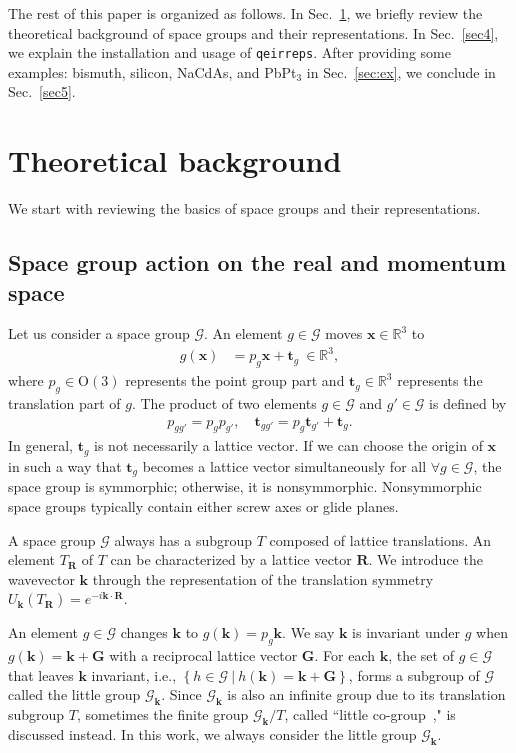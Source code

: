 \documentclass[3p,preprint]{elsarticle}
\newcommand{\bx}{\bm{x}}
\newcommand{\bk}{\bm{k}}
\newcommand{\bt}{\bm{t}}
\newcommand{\bR}{\bm{R}}
\newcommand{\bG}{\bm{G}}
\newcommand{\calG}{\mathcal{G}}
\newcommand{\calGk}{\mathcal{G}_{\bm{k}}}
\begin{document}
The rest of this paper is organized as follows. 
In Sec.~\ref{sec2}, we briefly review the theoretical background of space groups and their representations. 
In Sec.~\ref{sec4}, we explain the installation and usage of \texttt{qeirreps}. 
After providing some examples: bismuth, silicon, NaCdAs, and PbPt$_3$ in Sec.~\ref{sec:ex}, we conclude in Sec.~\ref{sec5}.

\section{Theoretical background}
\label{sec2}
We start with reviewing the basics of space groups and their representations.  

\subsection{Space group action on the real and momentum space}
\label{subsec:SG}
Let us consider a space group $\calG$. An element $g \in \calG$ moves $\bx\in\mathbb{R}^3$ to
\begin{align}
\label{eq:SG}
g(\bx) &= p_g \bx + \bt_{g}\ \in \mathbb{R}^3,
\end{align}
where $p_g\in\text{O}(3)$ represents the point group part and $\bt_{g}\in\mathbb{R}^3$ represents the translation part of $g$. The product of two elements $g\in \calG$ and $g'\in \calG$ is defined by
\begin{align}
\label{product_G}
p_{gg'} = p_gp_{g'}, \quad \bt_{gg'} = p_g\bt_{g'} + \bt_{g}.
\end{align}
In general, $\bt_{g}$ is not necessarily a lattice vector. If we can choose the origin of $\bx$ in such a way that $\bt_{g}$ becomes a lattice vector simultaneously for all $\forall g \in \calG$,  the space group is symmorphic; otherwise, it is nonsymmorphic.  Nonsymmorphic space groups typically contain either screw axes or glide planes. 

A space group $\calG$ always has a subgroup  $T$ composed of lattice translations. An element $T_{\bR}$ of $T$ can be characterized by a lattice vector $\bR$.  
We introduce the wavevector  $\bk$ through the representation of the translation symmetry $U_{\bk}(T_{\bR}) = e^{-i \bk \cdot \bR}$.

An element $g\in \mathcal{G}$ changes $\bk$ to $g(\bk) = p_g \bk$. We say $\bk$ is invariant under $g$ when $g(\bk) = \bk + \bG$ with a reciprocal lattice vector $\bG$. 
For each $\bk$, the set of $g\in\mathcal{G}$ that leaves $\bm{k}$ invariant, i.e., $\left\{h \in \calG\ \vert\ h(\bk) = \bk + \bG\right\}$, forms a subgroup of $\calG$ called the little group $\mathcal{G}_{\bm{k}}$.
Since $\calGk$ is also an infinite group due to its translation subgroup $T$, sometimes the finite group $\calGk/T$, called ``little co-group~\cite{Bradley}," is discussed instead. In this work, we always consider the little group $\calGk$.
\end{document}
